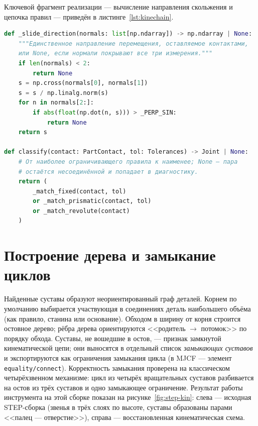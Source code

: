 Ключевой фрагмент реализации --- вычисление направления скольжения и цепочка
правил --- приведён в листинге~\ref{lst:kinechain}.

\begin{lstlisting}[language=Python,caption={Направление скольжения и цепочка правил (\texttt{joints.py}, фрагмент)},label=lst:kinechain]
def _slide_direction(normals: list[np.ndarray]) -> np.ndarray | None:
    """Единственное направление перемещения, оставляемое контактами,
    или None, если нормали покрывают все три измерения."""
    if len(normals) < 2:
        return None
    s = np.cross(normals[0], normals[1])
    s = s / np.linalg.norm(s)
    for n in normals[2:]:
        if abs(float(np.dot(n, s))) > _PERP_SIN:
            return None
    return s

def classify(contact: PartContact, tol: Tolerances) -> Joint | None:
    # От наиболее ограничивающего правила к наименее; None — пара
    # остаётся несоединённой и попадает в диагностику.
    return (
        _match_fixed(contact, tol)
        or _match_prismatic(contact, tol)
        or _match_revolute(contact)
    )
\end{lstlisting}

\section{Построение дерева и замыкание циклов}

Найденные суставы образуют неориентированный граф деталей. Корнем по умолчанию
выбирается участвующая в соединениях деталь наибольшего объёма (как правило,
станина или основание). Обходом в ширину от корня строится остовное дерево;
рёбра дерева ориентируются <<родитель $\rightarrow$ потомок>> по порядку
обхода. Суставы, не вошедшие в остов, --- признак замкнутой кинематической
цепи; они выносятся в отдельный список \emph{замыкающих суставов} и
экспортируются как ограничения замыкания цикла (в MJCF --- элемент
\texttt{equality/connect}). Корректность замыкания проверена на классическом
четырёхзвенном механизме: цикл из четырёх вращательных суставов разбивается на
остов из трёх суставов и одно замыкающее ограничение. Результат работы
инструмента на этой сборке показан на рисунке~\ref{fig:step-kin}: слева ---
исходная STEP-сборка (звенья в трёх слоях по высоте, суставы образованы
парами <<палец --- отверстие>>), справа --- восстановленная кинематическая
схема.


